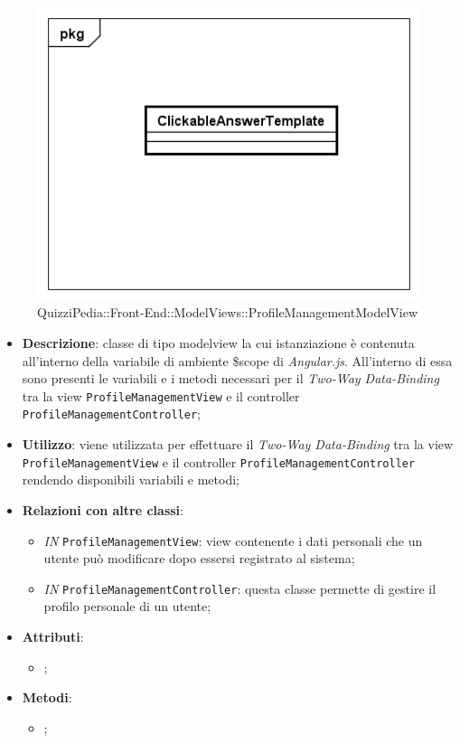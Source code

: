 	\begin{figure}[ht]
		\centering
		\includegraphics[scale=0.5,keepaspectratio]{UML/Classi/Front-End/QuizziPedia_Front-end_Templates_ClickableAnswerTemplate.png}
		\caption{QuizziPedia::Front-End::ModelViews::ProfileManagementModelView}
	\end{figure} \FloatBarrier
	
	\begin{itemize}
		\item \textbf{Descrizione}: classe di tipo modelview la cui istanziazione è contenuta all'interno della variabile di ambiente \$scope di \textit{Angular.js}. All'interno di essa sono presenti le variabili e i metodi necessari per il \textit{Two-Way Data-Binding} tra la view \texttt{ProfileManagementView} e il controller \texttt{ProfileManagementController};
		\item \textbf{Utilizzo}: viene utilizzata per effettuare il \textit{Two-Way Data-Binding} tra la view \texttt{ProfileManagementView} e il controller \texttt{ProfileManagementController} rendendo disponibili variabili e metodi;
		\item \textbf{Relazioni con altre classi}: 
		\begin{itemize}
			\item \textit{IN} \texttt{ProfileManagementView}: view contenente i dati personali che un utente può modificare dopo essersi registrato al sistema; 
			\item \textit{IN} \texttt{ProfileManagementController}: questa classe permette di gestire il profilo personale di un utente;
		\end{itemize}
		\item \textbf{Attributi}: 
		\begin{itemize}
			\item ;
		\end{itemize}
		\item \textbf{Metodi}: 
		\begin{itemize}
			\item ;
		\end{itemize}
	\end{itemize}	

